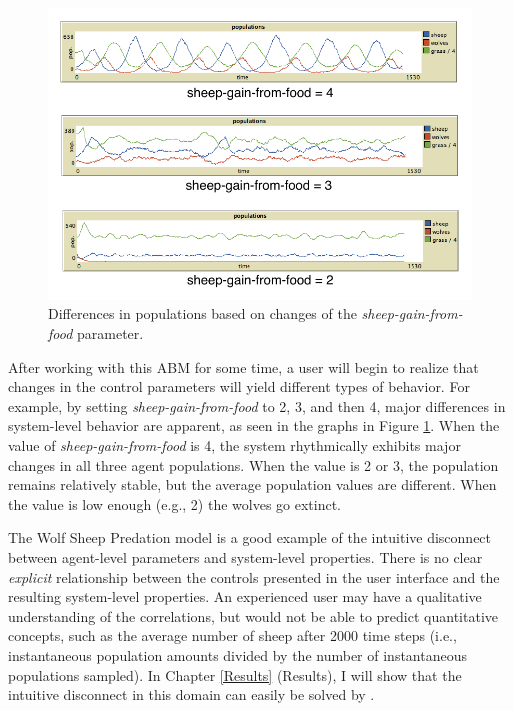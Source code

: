 \begin{figure}[ht]
\centering
\includegraphics[scale=1]{images/different_sheep.pdf}
\caption{Differences in populations based on changes of the \textit{sheep-gain-from-food} parameter.}
\label{fig:diffsheep}
\end{figure}

After working with this ABM for some time, a user will begin to realize that changes in the control parameters will yield different types of behavior.
For example, by setting \textit{sheep-gain-from-food} to 2, 3, and then 4, major differences in system-level behavior are apparent, as seen in the graphs in Figure \ref{fig:diffsheep}.
When the value of \textit{sheep-gain-from-food} is 4, the system rhythmically exhibits major changes in all three agent populations.
When the value is 2 or 3, the population remains relatively stable, but the average population values are different.
When the value is low enough (e.g., 2) the wolves go extinct.

The Wolf Sheep Predation model is a good example of the intuitive disconnect between agent-level parameters and system-level properties.
There is no clear \textit{explicit} relationship between the controls presented in the user interface and the resulting system-level properties.
An experienced user may have a qualitative understanding of the correlations, but would not be able to predict quantitative concepts, such as the average number of sheep after 2000 time steps (i.e., instantaneous population amounts divided by the number of instantaneous populations sampled).
In  Chapter \ref{Results} (Results), I will show that the intuitive disconnect in this domain can easily be solved by \fw.


